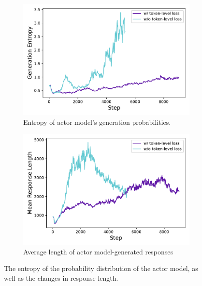 \begin{figure}
    \centering
    \begin{subfigure}{0.49\textwidth}
        \centering
        \includegraphics[width=\textwidth]{figures/3.3.1.pdf}
        \caption{Entropy of actor model's generation probabilities.}
        \label{fig:token_loss_entropy}
    \end{subfigure}
    \hfill
    \begin{subfigure}{0.49\textwidth}
        \centering
        \includegraphics[width=\textwidth]{figures/3.3.2.pdf}
        \caption{Average length of actor model-generated responses}
        \label{fig:token_loss_length}
    \end{subfigure}
    
    \caption{The entropy of the probability distribution of the actor model, as well as the changes in response length.}
    \label{fig:3212}
\end{figure}

